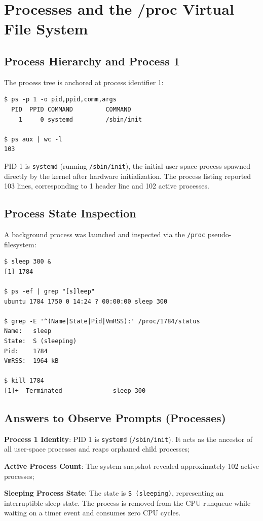 \documentclass{assets/utmreport}
\begin{document}
\chapter{Processes and the /proc Virtual File System}

\section{Process Hierarchy and Process 1}
The process tree is anchored at process identifier 1:
\begin{verbatim}
$ ps -p 1 -o pid,ppid,comm,args
  PID  PPID COMMAND         COMMAND
    1     0 systemd         /sbin/init

$ ps aux | wc -l
103
\end{verbatim}
PID 1 is \texttt{systemd} (running \texttt{/sbin/init}), the initial user-space process spawned directly by the kernel after hardware initialization. The process listing reported 103 lines, corresponding to 1 header line and 102 active processes.

\section{Process State Inspection}
A background process was launched and inspected via the \texttt{/proc} pseudo-filesystem:
\begin{verbatim}
$ sleep 300 &
[1] 1784

$ ps -ef | grep "[s]leep"
ubuntu 1784 1750 0 14:24 ? 00:00:00 sleep 300

$ grep -E '^(Name|State|Pid|VmRSS):' /proc/1784/status
Name:   sleep
State:  S (sleeping)
Pid:    1784
VmRSS:  1964 kB

$ kill 1784
[1]+  Terminated              sleep 300
\end{verbatim}

\section{Answers to Observe Prompts (Processes)}
\begin{utmenumerate}
\item \textbf{Process 1 Identity}: PID 1 is \texttt{systemd} (\texttt{/sbin/init}). It acts as the ancestor of all user-space processes and reaps orphaned child processes;
\item \textbf{Active Process Count}: The system snapshot revealed approximately 102 active processes;
\item \textbf{Sleeping Process State}: The state is \texttt{S (sleeping)}, representing an interruptible sleep state. The process is removed from the CPU runqueue while waiting on a timer event and consumes zero CPU cycles.
\end{utmenumerate}
\end{document}
